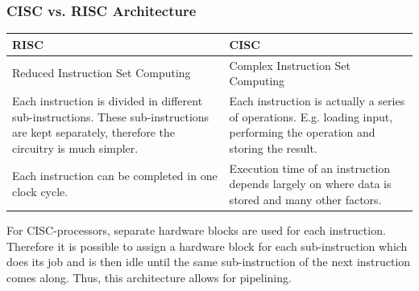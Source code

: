 		\subsubsection{CISC vs. RISC Architecture}
		\begin{table}[H]
			\centering
			\begin{tabular}{|p{0.425\textwidth}|p{}|}
				\hline
				\textbf{RISC}
					& \textbf{CISC}\\
				\hline
				Reduced Instruction Set Computing
					& Complex Instruction Set Computing\\
				\hline
				Each instruction is divided in different sub-instructions. These sub-instructions are kept separately, therefore the circuitry is much simpler.
					& Each instruction is actually a series of operations. E.g. loading input, performing the operation and storing the result.\\
				\hline
				Each instruction can be completed in one clock cycle.
					& Execution time of an instruction depends largely on where data is stored and many other factors.\\
				\hline
			\end{tabular}
		\end{table}		
		
		For CISC-processors, separate hardware blocks are used for each instruction. Therefore it is possible to assign a hardware block for each sub-instruction which does its job and is then idle until the same sub-instruction of the next instruction comes along. Thus, this architecture allows for pipelining.
		
